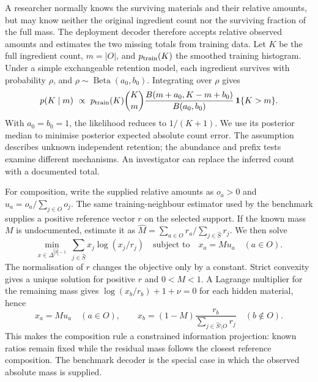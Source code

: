 \documentclass[applsci,article,submit,oneauthor]{Definitions/mdpi}
\begin{document}
A researcher normally knows the surviving materials and their relative amounts, but may know neither the original ingredient count nor the surviving fraction of the full mass. The deployment decoder therefore accepts relative observed amounts and estimates the two missing totals from training data. Let $K$ be the full ingredient count, $m=|O|$, and $p_{\rm train}(K)$ the smoothed training histogram. Under a simple exchangeable retention model, each ingredient survives with probability $\rho$, and $\rho\sim\operatorname{Beta}(a_0,b_0)$. Integrating over $\rho$ gives
\begin{equation}
p(K\mid m)\ \propto\ p_{\rm train}(K)\binom Km
\frac{B(m+a_0,K-m+b_0)}{B(a_0,b_0)}\,\mathbf1\{K>m\}.
\label{eq:unknown-retention}
\end{equation}
With $a_0=b_0=1$, the likelihood reduces to $1/(K+1)$. We use its posterior median to minimise posterior expected absolute count error. The assumption describes unknown independent retention; the abundance and prefix tests examine different mechanisms. An investigator can replace the inferred count with a documented total.

For composition, write the supplied relative amounts as $o_a>0$ and $u_a=o_a/\sum_{j\in O}o_j$. The same training-neighbour estimator used by the benchmark supplies a positive reference vector $r$ on the selected support. If the known mass $M$ is undocumented, estimate it as $\widehat M=\sum_{a\in O}r_a/\sum_{j\in\widehat S}r_j$. We then solve
\begin{equation}
\min_{x\in\Delta^{|\widehat S|-1}}\ \sum_{j\in\widehat S}x_j\log(x_j/r_j)
\quad\text{subject to}\quad x_a=M u_a\quad(a\in O).
\label{eq:kl-projection}
\end{equation}
The normalisation of $r$ changes the objective only by a constant. Strict convexity gives a unique solution for positive $r$ and $0<M<1$. A Lagrange multiplier for the remaining mass gives $\log(x_b/r_b)+1+\nu=0$ for each hidden material, hence
\begin{equation}
x_a=M u_a\quad(a\in O),\qquad
x_b=(1-M)\frac{r_b}{\sum_{j\in\widehat S\setminus O}r_j}\quad(b\notin O).
\label{eq:kl-solution}
\end{equation}
This makes the composition rule a constrained information projection: known ratios remain fixed while the residual mass follows the closest reference composition. The benchmark decoder is the special case in which the observed absolute mass is supplied.
\end{document}
